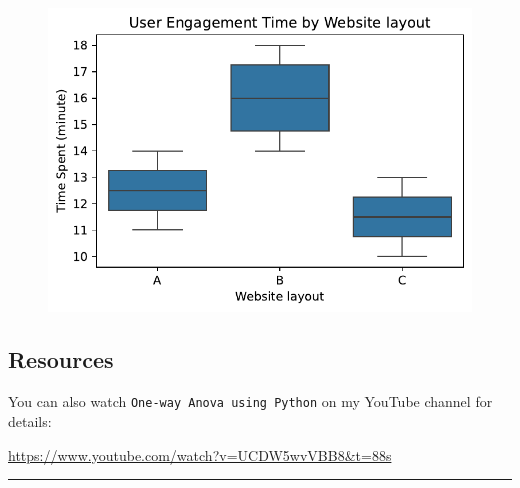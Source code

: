 \documentclass[
  letterpaper,
  DIV=11,
  numbers=noendperiod]{scrartcl}
\begin{document}
\begin{figure}[H]

{\centering \includegraphics{one-way-anova_files/figure-pdf/cell-7-output-1.pdf}

}

\end{figure}

\hypertarget{resources}{%
\subsection{Resources}\label{resources}}

You can also watch \texttt{One-way\ Anova\ using\ Python} on my YouTube
channel for details:

\url{https://www.youtube.com/watch?v=UCDW5wvVBB8\&t=88s}

\begin{center}\rule{0.5\linewidth}{0.5pt}\end{center}
\end{document}
